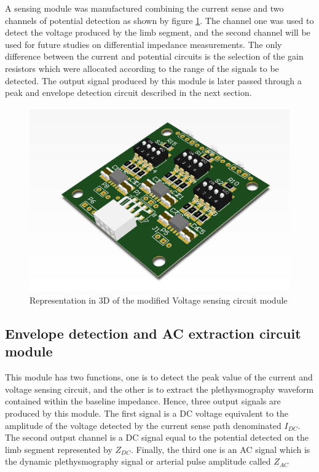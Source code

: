 A sensing module was manufactured combining the current sense and two channels of potential detection as shown by figure \ref{fig:voltage sense}. The channel one was used to detect the voltage produced by the limb segment, and the second channel will be used for future studies on differential impedance measurements. The only difference between the current and potential circuits is the selection of the gain resistors which were allocated according to the range of the signals to be detected. The output signal produced by this module is later passed through a peak and envelope detection circuit described in the next section. 

\begin{figure}[!htpb]
	\centering
	\includegraphics[width=7.5 cm,keepaspectratio]{figure_Vsense}
	\caption{Representation in 3D of the modified Voltage sensing circuit module}
	\label{fig:voltage sense}
\end{figure}



%

\subsection{Envelope detection and AC extraction circuit module}
\label{section material envelope}
This module has two functions, one is to detect the peak value of the current and voltage sensing circuit, and the other is to extract the plethysmography waveform contained within the baseline impedance. Hence, three output signals are produced by this module. The first signal is a DC voltage equivalent to the amplitude of the voltage detected by the current sense path denominated $I_{DC}$. The second output channel is a DC signal equal to the potential detected on the limb segment represented by $Z_{DC}$. Finally, the third one is an AC signal which is the dynamic plethysmography signal or arterial pulse amplitude called $Z_{AC}$

